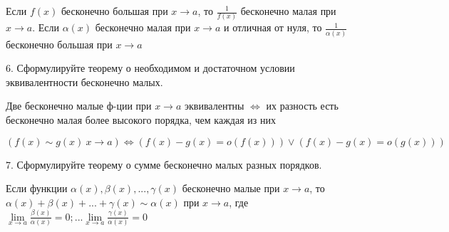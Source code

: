 \documentclass[a4paper, 10pt]{article}
\begin{document}
    Если $f(x)$ бесконечно большая при $x \to a$, то $\frac{1}{f(x)}$ бесконечно малая при $x \to a$.
    Если $\alpha  (x)$ бесконечно малая при $x \to a$ и отличная от нуля, то $\frac{1}{\alpha (x)}$ 
    бесконечно большая при $x \to a$

    \begin{bf}6. Сформулируйте теорему о необходимом и достаточном условии эквивалентности бесконечно малых. \end{bf}

    Две бесконечно малые ф-ции при $x \to a$ эквивалентны $\iff$ их разность есть бесконечно
    малая более высокого порядка, чем каждая из них

    $$(f(x) \sim g(x) \ x \to a) \iff (f(x) - g(x) = o(f(x))) \vee (f(x) - g(x) = o(g(x)))$$


    \begin{bf}7. Сформулируйте теорему о сумме бесконечно малых разных порядков. \end{bf}
    
    Если функции $\alpha  (x), \beta (x), ..., \gamma (x)$ бесконечно малые при $x \to a$,
    то $\alpha  (x) + \beta (x) + ... + \gamma (x) \sim \alpha  (x)$ при $x \to a$,
    где $\lim\limits_{x \to a} \frac{\beta (x)}{\alpha (x)} = 0; ...
    \lim\limits_{x \to a} \frac{\gamma (x)}{\alpha (x)} = 0$
    
\end{document}

